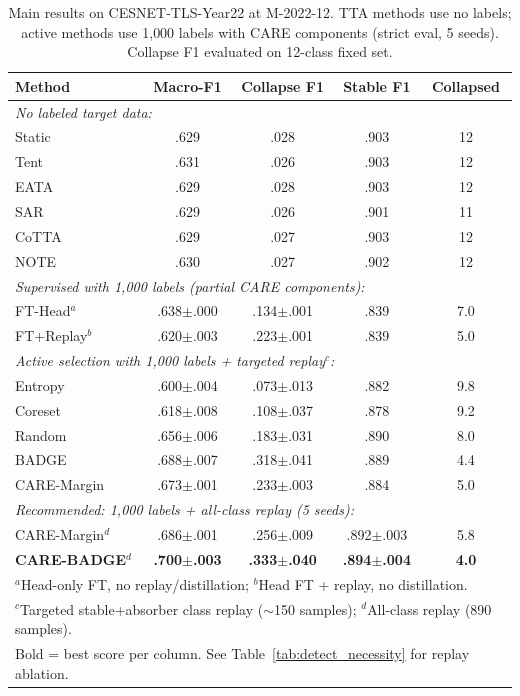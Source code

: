 \documentclass[journal]{IEEEtran}
\newcommand{\ours}{CARE}  %
\begin{document}
\begin{table}[t]
\centering
\caption{Main results on CESNET-TLS-Year22 at M-2022-12. TTA methods use no labels; active methods use 1{,}000 labels with \ours{} components (strict eval, 5 seeds). Collapse F1 evaluated on 12-class fixed set.}
\label{tab:main_results}
\small
\begin{tabular}{@{}l cccc@{}}
\toprule
Method & Macro-F1 & Collapse F1 & Stable F1 & Collapsed \\
\midrule
\multicolumn{5}{l}{\textit{No labeled target data:}} \\
Static          & .629 & .028 & .903 & 12 \\
Tent            & .631 & .026 & .903 & 12 \\
EATA            & .629 & .028 & .903 & 12 \\
SAR             & .629 & .026 & .901 & 11 \\
CoTTA           & .629 & .027 & .903 & 12 \\
NOTE            & .630 & .027 & .902 & 12 \\
\midrule
\multicolumn{5}{l}{\textit{Supervised with 1{,}000 labels (partial \ours{} components):}} \\
FT-Head$^a$     & .638$\pm$.000 & .134$\pm$.001 & .839 & 7.0 \\
FT+Replay$^b$   & .620$\pm$.003 & .223$\pm$.001 & .839 & 5.0 \\
\midrule
\multicolumn{5}{l}{\textit{Active selection with 1{,}000 labels + targeted replay$^c$:}} \\
Entropy         & .600$\pm$.004 & .073$\pm$.013 & .882 & 9.8 \\
Coreset         & .618$\pm$.008 & .108$\pm$.037 & .878 & 9.2 \\
Random          & .656$\pm$.006 & .183$\pm$.031 & .890 & 8.0 \\
BADGE~\cite{ash2020badge}  & .688$\pm$.007 & .318$\pm$.041 & .889 & 4.4 \\
\ours{}-Margin  & .673$\pm$.001 & .233$\pm$.003 & .884 & 5.0 \\
\midrule
\multicolumn{5}{l}{\textit{Recommended: 1{,}000 labels + all-class replay (5 seeds):}} \\
\ours{}-Margin$^d$  & .686$\pm$.001 & .256$\pm$.009 & .892$\pm$.003 & 5.8 \\
\textbf{\ours{}-BADGE}$^d$ & \textbf{.700$\pm$.003} & \textbf{.333$\pm$.040} & \textbf{.894$\pm$.004} & \textbf{4.0} \\
\bottomrule
\multicolumn{5}{l}{\footnotesize $^a$Head-only FT, no replay/distillation; $^b$Head FT + replay, no distillation.}\\
\multicolumn{5}{l}{\footnotesize $^c$Targeted stable+absorber class replay (${\sim}$150 samples); $^d$All-class replay (890 samples).}\\
\multicolumn{5}{l}{\footnotesize Bold = best score per column. See Table~\ref{tab:detect_necessity} for replay ablation.}
\end{tabular}
\end{table}
\end{document}
